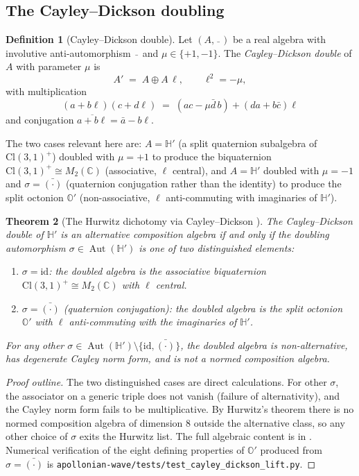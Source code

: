 \documentclass[11pt,a4paper]{article}
\theoremstyle{plain}
\newtheorem{theorem}{Theorem}[section]
\theoremstyle{definition}
\newtheorem{definition}[theorem]{Definition}
\theoremstyle{remark}
\numberwithin{equation}{section}
\providecommand{\Cl}{\mathrm{Cl}}
\providecommand{\C}{\mathbb{C}}
\providecommand{\Hp}{\mathbb{H}'}
\providecommand{\Os}{\mathbb{O}'}
\DeclareMathOperator{\Aut}{Aut}
\providecommand{\id}{\mathrm{id}}
\begin{document}
\subsection{The Cayley--Dickson doubling}

\begin{definition}[Cayley--Dickson double]
\label{def:cd-double}
Let $(A, \bar{\;\;})$ be a real algebra with involutive
anti-automorphism $\bar{\;\;}$ and $\mu \in \{+1, -1\}$.  The
\emph{Cayley--Dickson double} of $A$ with parameter $\mu$ is
\[
  A' \;=\; A \oplus A\,\ell, \qquad \ell^2 = -\mu,
\]
with multiplication
\begin{equation}
  (a + b\ell)(c + d\ell) \;=\; (ac - \mu\bar d\, b) + (d a + b\bar c)\ell
  \label{eq:cd-formula}
\end{equation}
and conjugation $\overline{a + b\ell} = \bar a - b\ell$.
\end{definition}

The two cases relevant here are: $A = \Hp$ (a split quaternion
subalgebra of $\Cl(3,1)^+$) doubled with $\mu = +1$ to produce the
biquaternion $\Cl(3,1)^+ \cong M_2(\C)$ (associative,
$\ell$ central), and $A = \Hp$ doubled with $\mu = -1$ and
$\sigma = \bar{(\cdot)}$ (quaternion conjugation rather than the
identity) to produce the split octonion $\Os$ (non-associative,
$\ell$ anti-commuting with imaginaries of $\Hp$).

\begin{theorem}[The Hurwitz dichotomy via Cayley--Dickson
{\cite[Thm.~3.1]{cd-lift}}]
\label{thm:hurwitz-dichotomy}
The Cayley--Dickson double of $\Hp$ is an alternative composition
algebra if and only if the doubling automorphism $\sigma \in
\Aut(\Hp)$ is one of two distinguished elements:
\begin{enumerate}[label=\textnormal{(\arabic*)}]
  \item $\sigma = \id$: the doubled algebra is the associative
    biquaternion $\Cl(3,1)^+ \cong M_2(\C)$ with $\ell$ central.
  \item $\sigma = \bar{(\cdot)}$ (quaternion conjugation): the
    doubled algebra is the split octonion $\Os$ with $\ell$
    anti-commuting with the imaginaries of $\Hp$.
\end{enumerate}
For any other $\sigma \in \Aut(\Hp) \setminus \{\id,
\bar{(\cdot)}\}$, the doubled algebra is non-alternative, has
degenerate Cayley norm form, and is not a normed composition
algebra.
\end{theorem}

\begin{proof}[Proof outline]
The two distinguished cases are direct calculations.  For other
$\sigma$, the associator on a generic triple does not vanish (failure
of alternativity), and the Cayley norm form fails to be
multiplicative.  By Hurwitz's theorem there is no normed
composition algebra of dimension $8$ outside the alternative
class, so any other choice of $\sigma$ exits the Hurwitz list.
The full algebraic content is in \cite[\S3]{cd-lift}.  Numerical
verification of the eight defining properties of $\Os$ produced
from $\sigma = \bar{(\cdot)}$ is
\texttt{apollonian-wave/tests/test\_cayley\_dickson\_lift.py}.
\end{proof}
\end{document}
